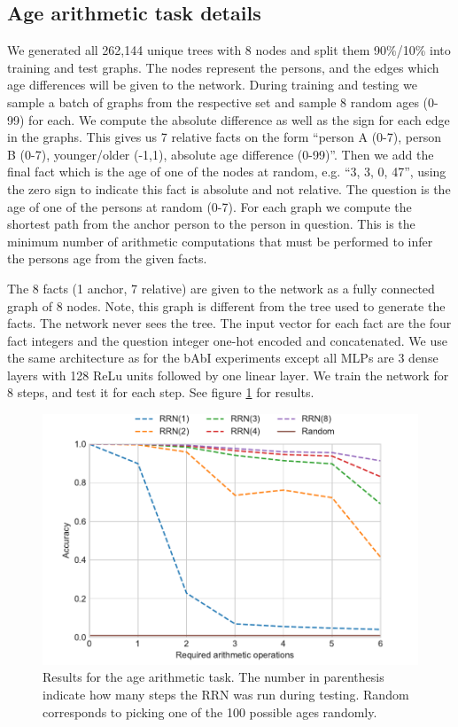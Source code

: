 \subsection{Age arithmetic task details}
We generated all 262,144 unique trees with 8 nodes and split them 90\%/10\% into training and test graphs. The nodes represent the persons, and the edges which age differences will be given to the network. During training and testing we sample a batch of graphs from the respective set and sample 8 random ages (0-99) for each. We compute the absolute difference as well as the sign for each edge in the graphs. This gives us 7 relative facts on the form “person A (0-7), person B (0-7), younger/older (-1,1), absolute age difference (0-99)”. Then we add the final fact which is the age of one of the nodes at random, e.g. “3, 3, 0, 47”, using the zero sign to indicate this fact is absolute and not relative. The question is the age of one of the persons at random (0-7). For each graph we compute the shortest path from the anchor person to the person in question. This is the minimum number of arithmetic computations that must be performed to infer the persons age from the given facts.

The 8 facts (1 anchor, 7 relative) are given to the network as a fully connected graph of 8 nodes. Note, this graph is different from the tree used to generate the facts. The network never sees the tree. The input vector for each fact are the four fact integers and the question integer one-hot encoded and concatenated. We use the same architecture as for the bAbI experiments except all MLPs are 3 dense layers with 128 ReLu units followed by one linear layer. We train the network for 8 steps, and test it for each step. See figure \ref{fig:age-results} for results. 

\begin{figure}[!ht]
\centering
\includegraphics[width=1.0\textwidth]{figures/age-results.pdf}
\caption{Results for the age arithmetic task. The number in parenthesis indicate how many steps the RRN was run during testing. Random corresponds to picking one of the 100 possible ages randomly.
\label{fig:age-results}}
\end{figure}

